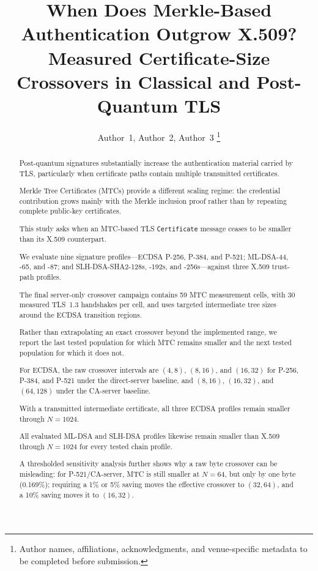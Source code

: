 \documentclass[journal]{IEEEtran}
\title{When Does Merkle-Based Authentication Outgrow X.509?\\ Measured Certificate-Size Crossovers in Classical and Post-Quantum TLS}
\author{
Author~1, Author~2, Author~3%
\thanks{Author names, affiliations, acknowledgments, and venue-specific metadata to be completed before submission.}
}
\begin{document}
\maketitle



\begin{abstract}

Post-quantum signatures substantially increase the authentication material carried by TLS, particularly when certificate paths contain multiple transmitted certificates.

Merkle Tree Certificates (MTCs) provide a different scaling regime: the credential contribution grows mainly with the Merkle inclusion proof rather than by repeating complete public-key certificates.

This study asks when an MTC-based TLS \texttt{Certificate} message ceases to be smaller than its X.509 counterpart.



We evaluate nine signature profiles---ECDSA P-256, P-384, and P-521; ML-DSA-44, -65, and -87; and SLH-DSA-SHA2-128s, -192s, and -256s---against three X.509 trust-path profiles.

The final server-only crossover campaign contains 59 MTC measurement cells, with 30 measured TLS~1.3 handshakes per cell, and uses targeted intermediate tree sizes around the ECDSA transition regions.

Rather than extrapolating an exact crossover beyond the implemented range, we report the last tested population for which MTC remains smaller and the next tested population for which it does not.



For ECDSA, the raw crossover intervals are $(4,8)$, $(8,16)$, and $(16,32)$ for P-256, P-384, and P-521 under the direct-server baseline, and $(8,16)$, $(16,32)$, and $(64,128)$ under the CA-server baseline.

With a transmitted intermediate certificate, all three ECDSA profiles remain smaller through $N=1024$.

All evaluated ML-DSA and SLH-DSA profiles likewise remain smaller than X.509 through $N=1024$ for every tested chain profile.

A thresholded sensitivity analysis further shows why a raw byte crossover can be misleading: for P-521/CA-server, MTC is still smaller at $N=64$, but only by one byte (0.169\%); requiring a 1\% or 5\% saving moves the effective crossover to $(32,64)$, and a 10\% saving moves it to $(16,32)$.




\end{abstract}
\end{document}
